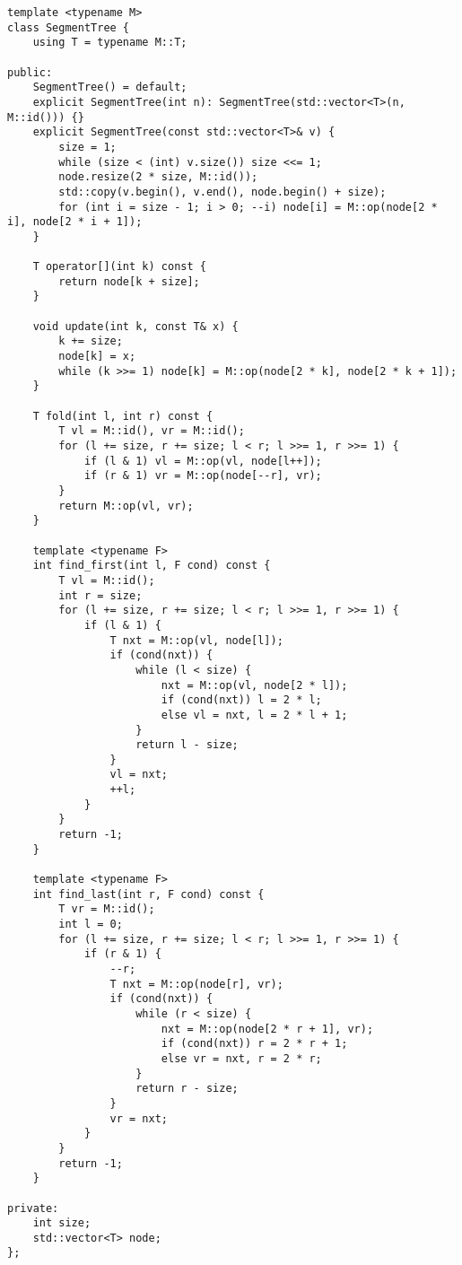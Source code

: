 \begin{lstlisting}
template <typename M>
class SegmentTree {
    using T = typename M::T;

public:
    SegmentTree() = default;
    explicit SegmentTree(int n): SegmentTree(std::vector<T>(n, M::id())) {}
    explicit SegmentTree(const std::vector<T>& v) {
        size = 1;
        while (size < (int) v.size()) size <<= 1;
        node.resize(2 * size, M::id());
        std::copy(v.begin(), v.end(), node.begin() + size);
        for (int i = size - 1; i > 0; --i) node[i] = M::op(node[2 * i], node[2 * i + 1]);
    }

    T operator[](int k) const {
        return node[k + size];
    }

    void update(int k, const T& x) {
        k += size;
        node[k] = x;
        while (k >>= 1) node[k] = M::op(node[2 * k], node[2 * k + 1]);
    }

    T fold(int l, int r) const {
        T vl = M::id(), vr = M::id();
        for (l += size, r += size; l < r; l >>= 1, r >>= 1) {
            if (l & 1) vl = M::op(vl, node[l++]);
            if (r & 1) vr = M::op(node[--r], vr);
        }
        return M::op(vl, vr);
    }

    template <typename F>
    int find_first(int l, F cond) const {
        T vl = M::id();
        int r = size;
        for (l += size, r += size; l < r; l >>= 1, r >>= 1) {
            if (l & 1) {
                T nxt = M::op(vl, node[l]);
                if (cond(nxt)) {
                    while (l < size) {
                        nxt = M::op(vl, node[2 * l]);
                        if (cond(nxt)) l = 2 * l;
                        else vl = nxt, l = 2 * l + 1;
                    }
                    return l - size;
                }
                vl = nxt;
                ++l;
            }
        }
        return -1;
    }

    template <typename F>
    int find_last(int r, F cond) const {
        T vr = M::id();
        int l = 0;
        for (l += size, r += size; l < r; l >>= 1, r >>= 1) {
            if (r & 1) {
                --r;
                T nxt = M::op(node[r], vr);
                if (cond(nxt)) {
                    while (r < size) {
                        nxt = M::op(node[2 * r + 1], vr);
                        if (cond(nxt)) r = 2 * r + 1;
                        else vr = nxt, r = 2 * r;
                    }
                    return r - size;
                }
                vr = nxt;
            }
        }
        return -1;
    }

private:
    int size;
    std::vector<T> node;
};
\end{lstlisting}

